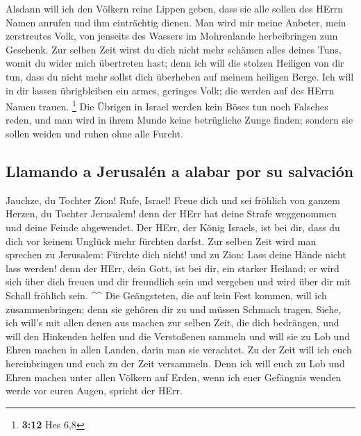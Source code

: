  Alsdann will ich den Völkern reine Lippen geben, dass sie
alle sollen des HErrn Namen anrufen und ihm einträchtig dienen.
 Man wird mir meine Anbeter, mein zerstreutes Volk, von
jenseits des Wassers im Mohrenlande herbeibringen zum Geschenk.
 Zur selben Zeit wirst du dich nicht mehr schämen alles
deines Tuns, womit du wider mich übertreten hast; denn ich will die
stolzen Heiligen von dir tun, dass du nicht mehr sollst dich überheben
auf meinem heiligen Berge.  Ich will in dir lassen
übrigbleiben ein armes, geringes Volk; die werden auf des HErrn Namen
trauen. \footnote{\textbf{3:12} Hes 6,8}  Die Übrigen in
Israel werden kein Böses tun noch Falsches reden, und man wird in ihrem
Munde keine betrügliche Zunge finden; sondern sie sollen weiden und
ruhen ohne alle Furcht.

\hypertarget{llamando-a-jerusaluxe9n-a-alabar-por-su-salvaciuxf3n}{%
\subsection{Llamando a Jerusalén a alabar por su
salvación}\label{llamando-a-jerusaluxe9n-a-alabar-por-su-salvaciuxf3n}}

 Jauchze, du Tochter Zion! Rufe, Israel! Freue dich und
sei fröhlich von ganzem Herzen, du Tochter Jerusalem! 
denn der HErr hat deine Strafe weggenommen und deine Feinde abgewendet.
Der HErr, der König Israels, ist bei dir, dass du dich vor keinem
Unglück mehr fürchten darfst.  Zur selben Zeit wird man
sprechen zu Jerusalem: Fürchte dich nicht! und zu Zion: Lass deine Hände
nicht lass werden!  denn der HErr, dein Gott, ist bei
dir, ein starker Heiland; er wird sich über dich freuen und dir
freundlich sein und vergeben und wird über dir mit Schall fröhlich sein.
\^{}\^{}  Die Geängsteten, die auf kein Fest kommen, will
ich zusammenbringen; denn sie gehören dir zu und müssen Schmach tragen.
 Siehe, ich will's mit allen denen aus machen zur selben
Zeit, die dich bedrängen, und will den Hinkenden helfen und die
Verstoßenen sammeln und will sie zu Lob und Ehren machen in allen
Landen, darin man sie verachtet.  Zu der Zeit will ich
euch hereinbringen und euch zu der Zeit versammeln. Denn ich will euch
zu Lob und Ehren machen unter allen Völkern auf Erden, wenn ich euer
Gefängnis wenden werde vor euren Augen, spricht der HErr.
